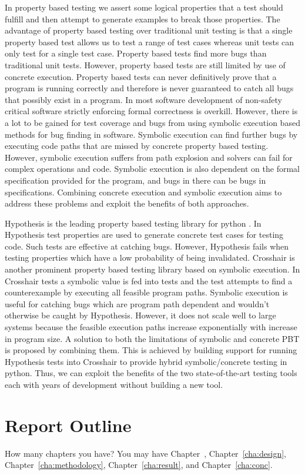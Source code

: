 In property based testing we assert some logical properties that a test should fulfill and then attempt to generate examples to break those properties. The advantage of property based testing over traditional unit testing is that a single property based test allows us to test a range of test cases whereas unit tests can only test for a single test case. Property based tests find more bugs than traditional unit tests. However, property based tests are still limited by use of concrete execution. Property based tests can never definitively prove that a program is running correctly and therefore is never guaranteed to catch all bugs that possibly exist in a program. In most software development of non-safety critical software strictly enforcing formal correctness is overkill. However, there is a lot to be gained for test coverage and bugs from using symbolic execution based methods for bug finding in software. Symbolic execution can find further bugs by executing code paths that are missed by concrete property based testing. However, symbolic execution suffers from path explosion and solvers can fail for complex operations and code. Symbolic execution is also dependent on the formal specification provided for the program, and bugs in there can be bugs in specifications. Combining concrete execution and symbolic execution aims to address these problems and exploit the benefits of both approaches.

Hypothesis is the leading property based testing library for python . In Hypothesis test properties are used to generate concrete test cases for testing code. Such tests are effective at catching bugs. However, Hypothesis fails when testing properties which have a low probability of being invalidated. Crosshair is another prominent property based testing library based on symbolic execution. In Crosshair tests a symbolic value is fed into tests and the test attempts to find a counterexample by executing all feasible program paths. Symbolic execution is useful for catching bugs which are program path dependent and wouldn’t otherwise be caught by Hypothesis. However, it does not scale well to large systems because the feasible execution paths increase exponentially with increase in program size. A solution to both the limitations of symbolic and concrete PBT is proposed by combining them. This is achieved by building support for running Hypothesis tests into Crosshair to provide hybrid symbolic/concrete testing in python. Thus, we can exploit the benefits of the two state-of-the-art testing tools each with years of development without building a new tool.




\section{Report Outline}
\label{sec:outline}

How many chapters you have? You may have Chapter~,
Chapter~\ref{cha:design}, Chapter~\ref{cha:methodology},
Chapter~\ref{cha:result}, and Chapter~\ref{cha:conc}.
